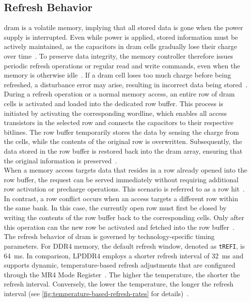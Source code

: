   \subsection{Refresh Behavior} \label{subsec:refresh-behavior}
    \gls{dram} is a volatile memory, implying that all stored data is gone when the 
    power supply is interrupted. Even while power is applied, stored information must be 
    actively maintained, as the capacitors in \gls{dram} cells gradually lose their charge over 
    time~\cite{paperFlippingBits}. To preserve data integrity, the memory controller therefore issues periodic refresh 
    operations or regular read and write commands, even when the memory is otherwise 
    idle~\cite{paperRowhammerOnSteroids, webSDRAMMemory, thesisDRAMA}. If a \gls{dram} cell loses too much charge before being refreshed, 
    a disturbance error may arise, resulting in incorrect data being stored~\cite{paperFlippingBits}.
    \\
    During a refresh operation or a normal memory access, an entire row of \gls{dram} cells is 
    activated and loaded into the dedicated row buffer. This process is initiated by activating 
    the corresponding wordline, which enables all access transistors in the selected row and 
    connects the capacitors to their respective bitlines. The row buffer temporarily stores 
    the data by sensing the charge from the cells, while the contents of the original 
    row is overwritten. Subsequently, the data stored in the row buffer is restored back 
    into the \gls{dram} array, ensuring that the original information is preserved~\cite{paperRHinDRAM, thesisDRAMA, paperRowhammerOnSteroids, thesisDRAMA}.
    \\
    When a memory access targets data that resides in a row already opened into the row buffer, 
    the request can be served immediately without requiring additional row activation or precharge 
    operations. This scenario is referred to as a row hit~\cite{thesisDRAMA}. In contrast, a row conflict 
    occurs when an access targets a different row 
    within the same bank. In this case, the currently open row must first be closed by writing 
    the contents of the row buffer back to the corresponding cells. Only after this operation 
    can the new row be activated and fetched into the row buffer~\cite{thesisDRAMA}.
    \\
    The refresh behavior of \gls{dram} is governed by technology-specific timing parameters. For 
    DDR4 memory, the default refresh window, denoted as \texttt{tREFI}, is 64~ms. In comparison, 
    LPDDR4 employs a shorter refresh interval of 32~ms and supports dynamic, temperature-based 
    refresh adjustments that are configured through the MR4 Mode Register~\cite{docJEDECLPDDR4,paperBlacksmith}. 
    The higher the temperature, the shorter the refresh interval. Conversely, the lower 
    the temperature, the longer the refresh interval (see \cref{fig:temperature-based-refresh-rates} for details)~\cite{paperBlacksmith,docJEDECLPDDR4,docJEDECLPDDR4x}.
    
